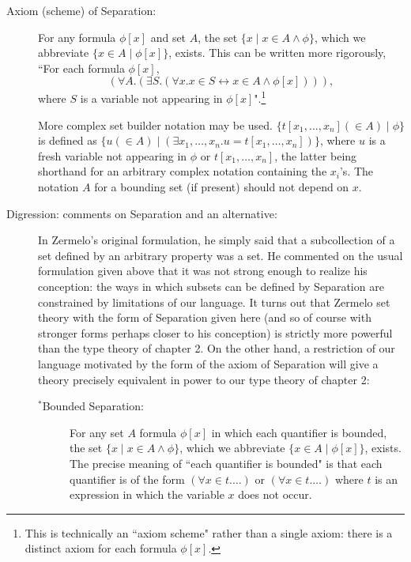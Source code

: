 \documentclass[12pt]{book}
\begin{document}
\begin{description}
\item[Axiom (scheme) of Separation:] For any formula $\phi[x]$ and set $A$, the set $\{x \mid x \in A \wedge \phi\}$, which we abbreviate $\{x
\in A \mid \phi[x]\}$, exists.  This can be written more rigorously, ``For each formula $\phi[x]$, $$(\forall A.(\exists S.(\forall x.x \in S \leftrightarrow x \in A \wedge \phi[x]))),$$ where $S$ is a variable not appearing in $\phi[x]$".\footnote{This is technically an ``axiom scheme" rather than a single axiom:  there is a distinct axiom for each formula $\phi[x]$.}

More complex set builder notation may be used.  $\{t[x_1,\ldots,x_n] (\in A) \mid \phi\}$ is defined as $\{u (\in A) \mid (\exists x_1,\ldots,x_n.u=t[x_1,\ldots,x_n])\}$, where $u$ is a fresh variable not appearing in $\phi$ or $t[x_1,\ldots,x_n]$, the latter being shorthand for an arbitrary complex notation containing the $x_i$'s.  The notation $A$ for a bounding set (if present) should not depend on $x$.

\item[Digression: comments on Separation and an alternative:]

In Zermelo's original formulation, he simply said that a subcollection of a set defined by an arbitrary property was a set.  He commented on the usual formulation given above that it was not strong enough to realize his conception:  the ways in which subsets can be defined by Separation are constrained by limitations of our language.  It turns out that Zermelo set theory with the form of Separation given here (and so of course with stronger forms perhaps closer to his conception) is strictly more powerful than the type theory of chapter 2.  On the other hand, a restriction of our language motivated by the form of the axiom of Separation will give a theory precisely equivalent in power to our type theory of chapter 2:

\begin{description}

\item[$^*$Bounded Separation:]  For any set $A$ formula $\phi[x]$ in which each quantifier is bounded, the set $\{x \mid x \in A \wedge \phi\}$, which we abbreviate $\{x
\in A \mid \phi[x]\}$, exists.   The precise meaning of ``each quantifier is bounded" is that each quantifier is of the form $(\forall x \in t.\ldots)$ or $(\forall x \in t.\ldots)$ where $t$ is an expression in which the variable $x$ does not occur.

\end{description}


\end{description}
\end{document}
